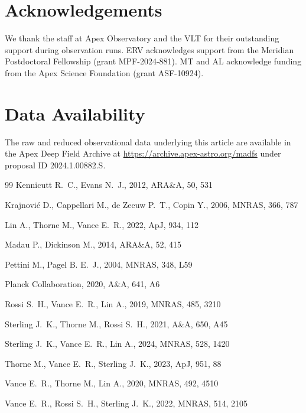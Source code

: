 \documentclass[fleqn,usenatbib]{mnras}
\begin{document}
\section*{Acknowledgements}
We thank the staff at Apex Observatory and the VLT for their outstanding support during observation runs. ERV acknowledges support from the Meridian Postdoctoral Fellowship (grant MPF-2024-881). MT and AL acknowledge funding from the Apex Science Foundation (grant ASF-10924).

\section*{Data Availability}
The raw and reduced observational data underlying this article are available in the Apex Deep Field Archive at \url{https://archive.apex-astro.org/madfs} under proposal ID 2024.1.00882.S.

\begin{thebibliography}{99}
Kennicutt R.~C., Evans N.~J., 2012, ARA\&A, 50, 531

Krajnovi\'{c} D., Cappellari M., de Zeeuw P.~T., Copin Y., 2006, MNRAS, 366, 787

Lin A., Thorne M., Vance E.~R., 2022, ApJ, 934, 112

Madau P., Dickinson M., 2014, ARA\&A, 52, 415

Pettini M., Pagel B. E.~J., 2004, MNRAS, 348, L59

Planck Collaboration, 2020, A\&A, 641, A6

Rossi S.~H., Vance E.~R., Lin A., 2019, MNRAS, 485, 3210

Sterling J.~K., Thorne M., Rossi S.~H., 2021, A\&A, 650, A45

Sterling J.~K., Vance E.~R., Lin A., 2024, MNRAS, 528, 1420

Thorne M., Vance E.~R., Sterling J.~K., 2023, ApJ, 951, 88

Vance E.~R., Thorne M., Lin A., 2020, MNRAS, 492, 4510

Vance E.~R., Rossi S.~H., Sterling J.~K., 2022, MNRAS, 514, 2105
\end{thebibliography}
\end{document}
